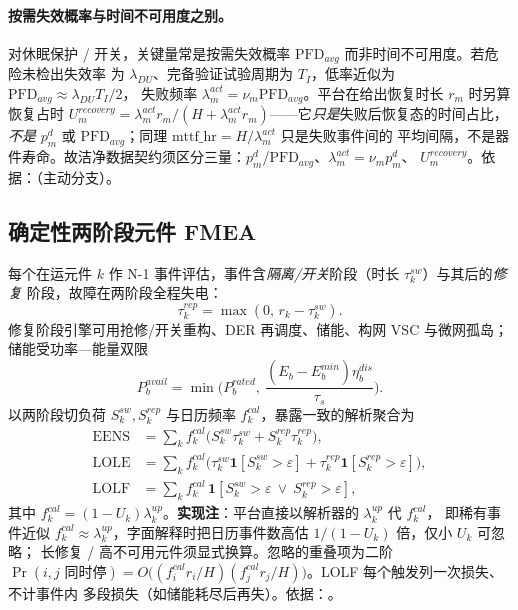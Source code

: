 \paragraph{按需失效概率与时间不可用度之别。}
对休眠保护 / 开关，关键量常是按需失效概率 $\mathrm{PFD}_{avg}$ 而非时间不可用度。若危险未检出失效率
为 $\lambda_{DU}$、完备验证试验周期为 $T_I$，低率近似为 $\mathrm{PFD}_{avg}\approx\lambda_{DU}T_I/2$，
失败频率 $\lambda_m^{act}=\nu_m\mathrm{PFD}_{avg}$。平台在给出恢复时长 $r_m$ 时另算恢复占时
$U_m^{recovery}=\lambda_m^{act}r_m/(H+\lambda_m^{act}r_m)$——它\emph{只是}失败后恢复态的时间占比，
\emph{不是} $p_m^d$ 或 $\mathrm{PFD}_{avg}$；同理 $\mathrm{mttf\_hr}=H/\lambda_m^{act}$ 只是失败事件间的
平均间隔，不是器件寿命。故洁净数据契约须区分三量：$p_m^d$/$\mathrm{PFD}_{avg}$、$\lambda_m^{act}=\nu_m p_m^d$、
$U_m^{recovery}$。依据：（主动分支）。

\subsection{确定性两阶段元件 FMEA}\label{sec:rel-fa-fmea}
每个在运元件 $k$ 作 N-1 事件评估，事件含\emph{隔离/开关}阶段（时长 $\tau_k^{sw}$）与其后的\emph{修复}
阶段，故障在两阶段全程失电：
\begin{equation}
 \tau_k^{rep}=\max(0,\,r_k-\tau_k^{sw}).
\end{equation}
修复阶段引擎可用抢修/开关重构、DER 再调度、储能、构网 VSC 与微网孤岛；储能受功率—能量双限
\begin{equation}
 P_b^{avail}=\min\!\Big(P_b^{rated},\ \frac{(E_b-E_b^{min})\eta_b^{dis}}{\tau_s}\Big).
\end{equation}
以两阶段切负荷 $S_k^{sw},S_k^{rep}$ 与日历频率 $f_k^{cal}$，暴露一致的解析聚合为
\begin{align}
 \mathrm{EENS}&=\sum_k f_k^{cal}\big(S_k^{sw}\tau_k^{sw}+S_k^{rep}\tau_k^{rep}\big),\\
 \mathrm{LOLE}&=\sum_k f_k^{cal}\big(\tau_k^{sw}\mathbf 1[S_k^{sw}{>}\varepsilon]+\tau_k^{rep}\mathbf 1[S_k^{rep}{>}\varepsilon]\big),\\
 \mathrm{LOLF}&=\sum_k f_k^{cal}\,\mathbf 1[S_k^{sw}{>}\varepsilon\ \lor\ S_k^{rep}{>}\varepsilon],
\end{align}
其中 $f_k^{cal}=(1-U_k)\lambda_k^{up}$。\textbf{实现注}：平台直接以解析器的 $\lambda_k^{up}$ 代 $f_k^{cal}$，
即稀有事件近似 $f_k^{cal}\approx\lambda_k^{up}$，字面解释时把日历事件数高估 $1/(1-U_k)$ 倍，仅小 $U_k$ 可忽略；
长修复 / 高不可用元件须显式换算。忽略的重叠项为二阶
$\Pr(i,j\text{ 同时停})=O\big((f_i^{cal}r_i/H)(f_j^{cal}r_j/H)\big)$。LOLF 每个触发列一次损失、不计事件内
多段损失（如储能耗尽后再失）。依据：。


